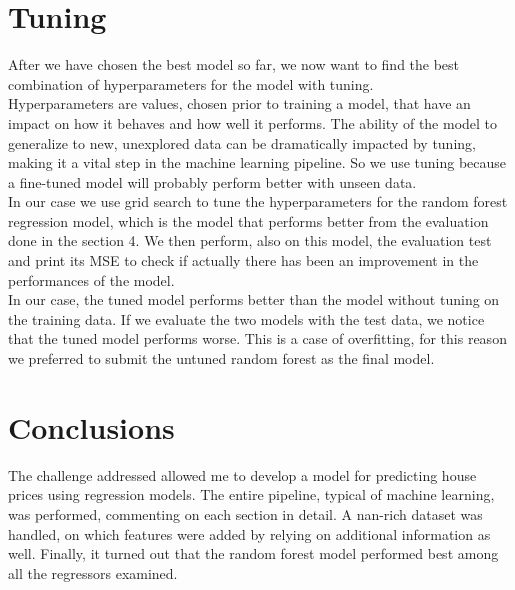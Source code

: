 \documentclass[10pt, notitlepage]{article}
\begin{document}
\color{blue}
\section{Tuning}
\color{black}
After we have chosen the best model so far, we now want to find the best combination of hyperparameters for the model with tuning.
\\
Hyperparameters are values, chosen prior to training a model, that have an impact on how it behaves and how well it performs. The ability of the model to generalize to new, unexplored data can be dramatically impacted by tuning, making it a vital step in the machine learning pipeline. So we use tuning because a fine-tuned model will probably perform better with unseen data.
\\
In our case we use grid search to tune the hyperparameters for the random forest regression model, which is the model that performs better from the evaluation done in the section 4. We then perform, also on this model, the evaluation test and print its MSE to check if actually there has been an improvement in the performances of the model. 
\\
In our case, the tuned model performs better than the model without tuning on the training data. If we evaluate the two models with the test data, we notice that the tuned model performs worse. This is a case of overfitting, for this reason we preferred to submit the untuned random forest as the final model. 
\color{blue}
\section{Conclusions}
\color{black}
The challenge addressed allowed me to develop a model for predicting house prices using regression models. The entire pipeline, typical of machine learning, was performed, commenting on each section in detail. A nan-rich dataset was handled, on which features were added by relying on additional information as well. Finally, it turned out that the random forest model performed best among all the regressors examined. 
\end{document}
